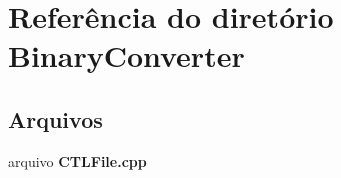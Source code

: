 \section{Referência do diretório Binary\+Converter}
\label{dir_8cb0e7ae03f63647a06a67c407a5c9ff}
\subsection*{Arquivos}
\begin{DoxyCompactItemize}
\item 
arquivo {\bf C\+T\+L\+File.\+cpp}
\end{DoxyCompactItemize}
